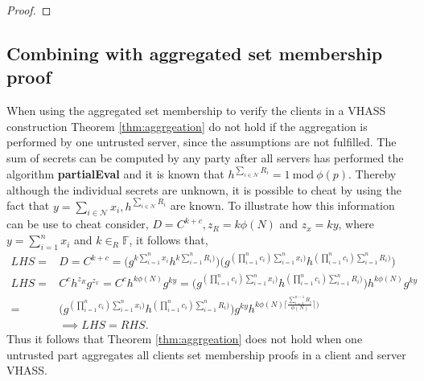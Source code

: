 \begin{proof}
\begin{comment}
The proof of security argument for malicious servers given in \cite{SumItUp} is still sufficient since the Pedersen commitment is perfectly hiding and computationally binding and that the range proofs are zero knowledge. The security argument for malicious clients follows from the soundness of the range proof and that the secret hidden in the commitment has to be the same as the secret in the shares, as argued above. . 

The proof of \textit{\textbf{Verifiability Severs}} is the same as the proof given in  in \cite{SumItUp}, except that the commitments $\pi_i$ replaces the checksums $\tau_i$.  \textit{\textbf{Verifiability Clients}} follows from the properties of the range proof.
\end{comment}
\end{proof}

\subsection*{Combining with aggregated set membership proof}
When using the aggregated set membership to verify the clients in a VHASS construction Theorem \ref{thm:aggrgeation} do not hold if the aggregation is performed by one untrusted server, since the assumptions are not fulfilled.  The sum of secrets can be computed by any party after all servers has performed the algorithm \textbf{partialEval} and it is known that $h^{\sum_{i\in\mathcal{N}} R_i } =1 \: \text{mod}\:  \phi(p)$. Thereby although the individual secrets are unknown, it is possible to cheat by using the fact that $y=\sum_{i\in\mathcal{N}}x_i, h^{\sum_{i\in\mathcal{N}}R_i}$ are known. To illustrate how this information can be use to cheat consider, $D=C^{k+c}, z_R = k\phi (N)$ and $z_x = k y$, where $y= \sum_{i=1}^n x_i$ and $k\in_R \mathds{F}$, it follows that, 
\begin{align*}
LHS =& D = C^{k+c}= \big( g^ { k \sum_{i=1}^n x_i } h^{ k  \sum_{i=1}^n R_i ) } \big)   \big( g^{ (  \prod_{i=1}^n c_i ) \sum_{i=1}^n x_i ) } h^{ ( \prod_{i=1}^n c_i ) \sum_{i=1}^n R_i ) } \big)   \\
LHS =& C^c h^{z_R}g^{z_x} = C^c h^{k \phi (N) } g^{k y} =  \big( g^{ (  \prod_{i=1}^n c_i ) \sum_{i=1}^n x_i ) } h^{ ( \prod_{i=1}^n c_i ) \sum_{i=1}^n R_i ) } \big) h^{k\phi (N)} g^{ky}\\
= &  \big( g^{ (  \prod_{i=1}^n c_i ) \sum_{i=1}^n x_i ) } h^{ ( \prod_{i=1}^n c_i ) \sum_{i=1}^n R_i ) } \big)g^ { k y} h^{ k  \phi(N)\lceil \frac{\sum_{i=1}^{n-1}R_i}{\phi(N)}\rceil ) }\\
& \implies LHS= RHS.
\end{align*}
Thus it follows that Theorem \ref{thm:aggrgeation} does not hold when one untrusted part aggregates all clients set membership proofs in a client and server VHASS. 

